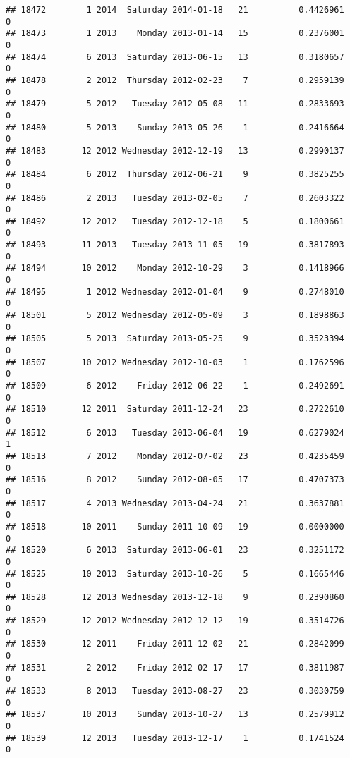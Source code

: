\documentclass[
]{article}
\begin{document}
\begin{verbatim}
## 18472        1 2014  Saturday 2014-01-18   21          0.4426961             0
## 18473        1 2013    Monday 2013-01-14   15          0.2376001             0
## 18474        6 2013  Saturday 2013-06-15   13          0.3180657             0
## 18478        2 2012  Thursday 2012-02-23    7          0.2959139             0
## 18479        5 2012   Tuesday 2012-05-08   11          0.2833693             0
## 18480        5 2013    Sunday 2013-05-26    1          0.2416664             0
## 18483       12 2012 Wednesday 2012-12-19   13          0.2990137             0
## 18484        6 2012  Thursday 2012-06-21    9          0.3825255             0
## 18486        2 2013   Tuesday 2013-02-05    7          0.2603322             0
## 18492       12 2012   Tuesday 2012-12-18    5          0.1800661             0
## 18493       11 2013   Tuesday 2013-11-05   19          0.3817893             0
## 18494       10 2012    Monday 2012-10-29    3          0.1418966             0
## 18495        1 2012 Wednesday 2012-01-04    9          0.2748010             0
## 18501        5 2012 Wednesday 2012-05-09    3          0.1898863             0
## 18505        5 2013  Saturday 2013-05-25    9          0.3523394             0
## 18507       10 2012 Wednesday 2012-10-03    1          0.1762596             0
## 18509        6 2012    Friday 2012-06-22    1          0.2492691             0
## 18510       12 2011  Saturday 2011-12-24   23          0.2722610             0
## 18512        6 2013   Tuesday 2013-06-04   19          0.6279024             1
## 18513        7 2012    Monday 2012-07-02   23          0.4235459             0
## 18516        8 2012    Sunday 2012-08-05   17          0.4707373             0
## 18517        4 2013 Wednesday 2013-04-24   21          0.3637881             0
## 18518       10 2011    Sunday 2011-10-09   19          0.0000000             0
## 18520        6 2013  Saturday 2013-06-01   23          0.3251172             0
## 18525       10 2013  Saturday 2013-10-26    5          0.1665446             0
## 18528       12 2013 Wednesday 2013-12-18    9          0.2390860             0
## 18529       12 2012 Wednesday 2012-12-12   19          0.3514726             0
## 18530       12 2011    Friday 2011-12-02   21          0.2842099             0
## 18531        2 2012    Friday 2012-02-17   17          0.3811987             0
## 18533        8 2013   Tuesday 2013-08-27   23          0.3030759             0
## 18537       10 2013    Sunday 2013-10-27   13          0.2579912             0
## 18539       12 2013   Tuesday 2013-12-17    1          0.1741524             0

\end{verbatim}
\end{document}
